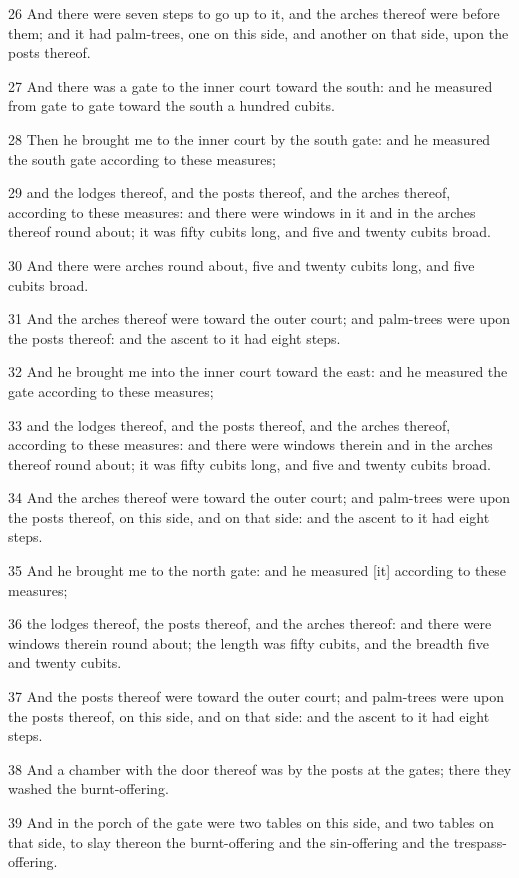 \par 26 And there were seven steps to go up to it, and the arches thereof were before them; and it had palm-trees, one on this side, and another on that side, upon the posts thereof.
\par 27 And there was a gate to the inner court toward the south: and he measured from gate to gate toward the south a hundred cubits.
\par 28 Then he brought me to the inner court by the south gate: and he measured the south gate according to these measures;
\par 29 and the lodges thereof, and the posts thereof, and the arches thereof, according to these measures: and there were windows in it and in the arches thereof round about; it was fifty cubits long, and five and twenty cubits broad.
\par 30 And there were arches round about, five and twenty cubits long, and five cubits broad.
\par 31 And the arches thereof were toward the outer court; and palm-trees were upon the posts thereof: and the ascent to it had eight steps.
\par 32 And he brought me into the inner court toward the east: and he measured the gate according to these measures;
\par 33 and the lodges thereof, and the posts thereof, and the arches thereof, according to these measures: and there were windows therein and in the arches thereof round about; it was fifty cubits long, and five and twenty cubits broad.
\par 34 And the arches thereof were toward the outer court; and palm-trees were upon the posts thereof, on this side, and on that side: and the ascent to it had eight steps.
\par 35 And he brought me to the north gate: and he measured [it] according to these measures;
\par 36 the lodges thereof, the posts thereof, and the arches thereof: and there were windows therein round about; the length was fifty cubits, and the breadth five and twenty cubits.
\par 37 And the posts thereof were toward the outer court; and palm-trees were upon the posts thereof, on this side, and on that side: and the ascent to it had eight steps.
\par 38 And a chamber with the door thereof was by the posts at the gates; there they washed the burnt-offering.
\par 39 And in the porch of the gate were two tables on this side, and two tables on that side, to slay thereon the burnt-offering and the sin-offering and the trespass-offering.
